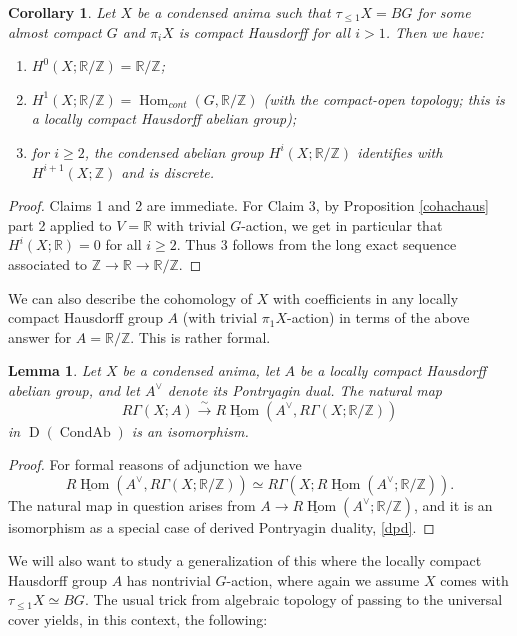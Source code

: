 \documentclass[12pt]{article}
\newtheorem{lemma}[theorem]{Lemma}
\newtheorem{corollary}[theorem]{Corollary}
\theoremstyle{definition}
\newcommand{\on}{\operatorname}
\newcommand{\mbb}{\mathbb}
\newcommand{\ul}{\underline}
\begin{document}
\begin{corollary}\label{cohrmodz}
Let $X$ be a condensed anima such that $\tau_{\leq 1}X=BG$ for some  almost compact $G$ and $\pi_iX$ is compact Hausdorff for all $i>1$.  Then we have:

\begin{enumerate}
\item $H^0(X;\mbb{R}/\mbb{Z})=\mbb{R}/\mbb{Z}$;
\item $H^1(X;\mbb{R}/\mbb{Z})= \on{Hom}_{cont}(G,\mbb{R}/\mbb{Z})$ (with the compact-open topology; this is a locally compact Hausdorff abelian group);
\item for $i\geq 2$, the condensed abelian group $H^i(X;\mbb{R}/\mbb{Z})$ identifies with $H^{i+1}(X;\mbb{Z})$ and is discrete.
\end{enumerate}
\end{corollary}
\begin{proof}
Claims 1 and 2 are immediate.  For Claim  3, by Proposition \ref{cohachaus} part 2 applied to $V=\mbb{R}$ with trivial $G$-action, we get in particular that $H^i(X;\mbb{R})=0$ for all $i\geq 2$.  Thus 3 follows from the long exact sequence associated to $\mbb{Z} \to \mbb{R} \to \mbb{R}/\mbb{Z}$.
\end{proof}

We can also describe the cohomology of $X$ with coefficients in any locally compact Hausdorff group $A$ (with trivial $\pi_1X$-action) in terms of the above answer for $A=\mbb{R}/\mbb{Z}$.  This is rather formal.

\begin{lemma}\label{cohlchauscoeff}
Let $X$ be a condensed anima, let $A$ be a locally compact Hausdorff abelian group, and let $A^\vee$ denote its Pontryagin dual.  The natural map
$$R\Gamma(X;A)\overset{\sim}{\longrightarrow} \ul{R\on{Hom}}(A^\vee, R\Gamma(X;\mbb{R}/\mbb{Z}))$$
in $\on{D}(\on{CondAb})$ is an isomorphism.
\end{lemma}
\begin{proof}
For formal reasons of adjunction we have
$$\ul{R\on{Hom}}(A^\vee,R\Gamma(X;\mbb{R}/\mbb{Z}))\simeq R\Gamma(X;\ul{R\on{Hom}}(A^\vee;\mbb{R}/\mbb{Z})).$$
The natural map in question arises from $A \to \ul{R\on{Hom}}(A^\vee;\mbb{R}/\mbb{Z})$, and it is an isomorphism as a special case of derived Pontryagin duality, \ref{dpd}.
\end{proof}

We will also want to study a generalization of this where the locally compact Hausdorff group $A$ has nontrivial $G$-action, where again we assume $X$ comes with $\tau_{\leq 1}X\simeq BG$.  The usual trick from algebraic topology of passing to the universal cover yields, in this context, the following:
\end{document}
